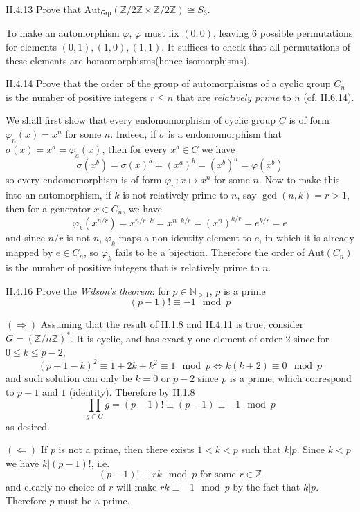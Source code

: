 \begin{problem}{II.4.13}
Prove that $\text{Aut}_\textsf{Grp}(\mathbb{Z}/2\mathbb{Z} \times \mathbb{Z}/2\mathbb{Z}) \cong S_3$.
\end{problem}
\begin{pf}
To make an automorphism $\varphi$, $\varphi$ must fix $(0,0)$, leaving 6 possible permutations for elements $(0,1), (1,0), (1,1)$. It suffices to check that all permutations of these elements are homomorphisms(hence isomorphisms). 
\end{pf}

\begin{problem}{II.4.14}
Prove that the order of the group of automorphisms of a cyclic group $C_n$ is the number of positive integers $r \leq n$ that are \emph{relatively prime} to $n$ (cf. II.6.14).	
\end{problem}
\begin{pf}
We shall first show that every endomomorphism of cyclic group $C$ is of form $\varphi_n(x) = x^n$ for some $n$. Indeed, if $\sigma$ is a endomomorphism that $\sigma(x) = x^a = \varphi_a(x)$, then for every $x^b \in C$ we have
\[
\sigma(x^b) = \sigma(x)^b = (x^a)^b = (x^b)^a = \varphi(x^b)	
\]
so every endomomorphism is of form $\varphi_n : x \mapsto x^n$ for some $n$. Now to make this into an automorphism, if $k$ is not relatively prime to $n$, say $\gcd(n,k) = r > 1$, then for a generator $x \in C_n$, we have
\[
\varphi_k(x^{n/r}) = x^{n/r \cdot k} = x^{n \cdot k/r} = (x^{n})^{k/r} = e^{k/r} = e
\]
and since $n/r$ is not $n$, $\varphi_k$ maps a non-identity element to $e$, in which it is already mapped by $e \in C_n$, so $\varphi_k$ fails to be a bijection. Therefore the order of $\text{Aut}(C_n)$ is the number of positive integers that is relatively prime to $n$.
\end{pf}

\begin{problem}{II.4.16}
Prove the \textit{Wilson's theorem}: for $p \in \mathbb{N}_{>1}$, $p$ is a prime \iffw
\[
(p-1)! \equiv -1 \mod p
\]
\end{problem}
\begin{pf}
$(\Rightarrow)$ Assuming that the result of II.1.8 and II.4.11 is true, consider $G = (\mathbb{Z}/n\mathbb{Z})^*$. It is cyclic, and has exactly one element of order 2 since for $0 \leq k \leq p - 2$,
\[
(p-1-k)^2 \equiv 1 + 2k + k^2 \equiv 1 \mod p \iff k(k+2) \equiv 0 \mod p 
\]
and such solution can only be $k = 0 \text { or } p-2$ since $p$ is a prime, which correspond to $p-1$ and $1$ (identity). Therefore by II.1.8
\[
\prod_{g \in G} g = (p-1)! \equiv (p-1) \equiv -1 \mod p
\]
as desired.

\noindent $(\Leftarrow)$ If $p$ is not a prime, then there exists $1 < k < p$ such that $k|p$. Since $k < p$ we have $k | (p-1)!$, i.e. 
\[
(p-1)! \equiv rk \mod p \text{ for some } r \in \mathbb{Z}
\]
and clearly no choice of $r$ will make $rk \equiv -1 \mod p$ by the fact that $k|p$. Therefore $p$ must be a prime.
\end{pf}

